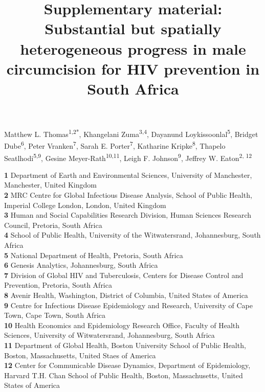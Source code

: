 \documentclass{article}
\title{Supplementary material: Substantial but spatially heterogeneous progress in male circumcision for HIV prevention in South Africa}
\author{}
\date{}
\begin{document}

\maketitle

\vspace{-1.5cm}

Matthew L. Thomas\textsuperscript{1,2*},
Khangelani Zuma\textsuperscript{3,4},
Dayanund Loykissoonlal\textsuperscript{5},
Bridget Dube\textsuperscript{6},
Peter Vranken\textsuperscript{7},
Sarah E. Porter\textsuperscript{7},
Katharine Kripke\textsuperscript{8},
Thapelo Seatlhodi\textsuperscript{5,9},
Gesine Meyer-Rath\textsuperscript{10,11},
Leigh F. Johnson\textsuperscript{9},
Jeffrey W. Eaton\textsuperscript{2, 12} \\

\vspace{-0.5cm}
  
\textbf{1} Department of Earth and Environmental Sciences, University of Manchester, Manchester, United Kingdom\\
\textbf{2} MRC Centre for Global Infectious Disease Analysis, School of Public Health, Imperial College London, London, United Kingdom\\
\textbf{3} Human and Social Capabilities Research Division, Human Sciences Research Council,  Pretoria, South Africa\\
\textbf{4} School of Public Health, University of the Witwatersrand, Johannesburg, South Africa\\
\textbf{5} National Department of Health, Pretoria, South Africa\\
\textbf{6} Genesis Analytics, Johannesburg, South Africa\\
\textbf{7} Division of Global HIV and Tuberculosis, Centers for Disease Control and Prevention, Pretoria, South Africa\\
\textbf{8} Avenir Health, Washington, District of Columbia, United States of America\\
\textbf{9} Centre for Infectious Disease Epidemiology and Research, University of Cape Town, Cape Town, South Africa \\
\textbf{10} Health Economics and Epidemiology Research Office, Faculty of Health Sciences, University of Witwatersrand, Johannesburg, South Africa\\
\textbf{11} Department of Global Health, Boston University School of Public Health, Boston, Massachusetts, United Staes of America\\
\textbf{12} Center for Communicable Disease Dynamics, Department of Epidemiology, Harvard T.H. Chan School of Public Health, Boston, Massachusetts, United States of America\\
\end{document}
